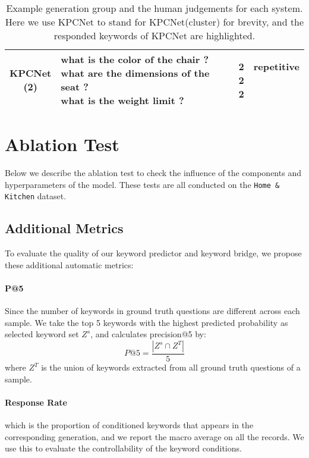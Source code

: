 \documentclass[letterpaper]{article} %
\begin{document}
\begin{table*}[htbp]
\begin{tabular}{c|lcc}
      \hline
      \makecell[c]{KPCNet \\ (2)} & \makecell[l]{what is the \textbf{color} of the \textbf{chair} ? \\ what are the \textbf{dimensions} of the \textbf{seat} ? \\ what is the \textbf{weight} limit ? } & \makecell[c]{2 \\ 2 \\ 2} & \makecell[c]{ repetitive \\ \\  \\ } \\
      \hline
      \end{tabular}
      \caption{\label{table:quality} Example generation group and the human judgements for each system. Here we use KPCNet to stand for KPCNet(cluster) for brevity, and the responded keywords of KPCNet are highlighted. }
\end{table*}

\section{Ablation Test}
\label{sec:ablation}

Below we describe the ablation test to check the influence of the components and hyperparameters of the model. These tests are all conducted on the \texttt{Home \& Kitchen} dataset.

\subsection{Additional Metrics}


To evaluate the quality of our keyword predictor and keyword bridge, we propose these additional automatic metrics:
\paragraph{P@5} Since the number of keywords in ground truth questions are different across each sample. We take the top 5 keywords with the highest predicted probability as selected keyword set $Z^s$, and calculates precision@5 by:
\begin{equation}
  P@5 = \frac{|Z^s \cap Z^T|}{5}
\end{equation}
where $Z^T$ is the union of keywords extracted from all ground truth questions of a sample.

\paragraph{Response Rate} which is the proportion of conditioned keywords that appears in the corresponding generation, and we report the macro average on all the records. We use this to evaluate the controllability of the keyword conditions.
\end{document}
